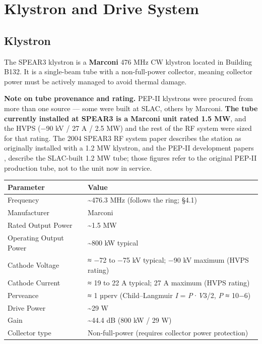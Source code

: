 \section{Klystron and Drive System}

\subsection{Klystron}

The SPEAR3 klystron is a \textbf{Marconi} 476 MHz CW klystron located in Building B132. It is a single-beam tube with a non-full-power collector, meaning collector power must be actively managed to avoid thermal damage.

\begin{keynote}
\textbf{Note on tube provenance and rating.} PEP-II klystrons were procured from more than one source --- some were built at SLAC, others by Marconi. \textbf{The tube currently installed at SPEAR3 is a Marconi unit rated 1.5 MW}, and the HVPS (−90 kV / 27 A / 2.5 MW) and the rest of the RF system were sized for that rating. The 2004 SPEAR3 RF system paper  describes the station as originally installed with a 1.2 MW klystron, and the PEP-II development papers ,  describe the SLAC-built 1.2 MW tube; those figures refer to the original PEP-II production tube, not to the unit now in service.
\end{keynote}

\begin{longtable}[]{@{}ll@{}}
\toprule\noalign{}
Parameter & Value \\
\midrule\noalign{}
\endhead
\bottomrule\noalign{}
\endlastfoot
Frequency & \textasciitilde476.3 MHz (follows the ring; §4.1) \\
Manufacturer & Marconi \\
Rated Output Power & \textasciitilde1.5 MW \\
Operating Output Power & \textasciitilde800 kW typical \\
Cathode Voltage & ≈ −72 to −75 kV typical; −90 kV maximum (HVPS rating) \\
Cathode Current & ≈ 19 to 22 A typical; 27 A maximum (HVPS rating) \\
Perveance & ≈ 1 µperv (Child--Langmuir \emph{I} = \emph{P}·\emph{V}3/2, \emph{P} ≈ 10−6) \R{56} \\
Drive Power & \textasciitilde29 W \\
Gain & \textasciitilde44.4 dB (800 kW / 29 W) \\
Collector type & Non-full-power (requires collector power protection) \\
\end{longtable}

